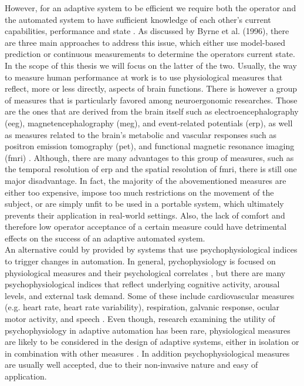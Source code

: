 However, for an adaptive system to be efficient we require both the operator and the automated system to have sufficient knowledge of each other's current capabilities, performance and state \cite{Byrne1996}.
As discussed by Byrne et al. (1996), there are three main approaches to address this issue, which either use model-based prediction or continuous measurements to determine the operators current state. In the scope of this thesis we will focus on the latter of the two. 
Usually, the way to measure human performance at work is to use physiological measures that reflect, more or less directly, aspects of brain functions. There is however a group of measures that is particularly favored among neuroergonomic researches. Those are the ones that are derived from the brain itself such as electroencephalography (\gls{eeg}), magnetencephalography (\gls{meg}), and event-related potentials (\gls{erp}), as well as measures related to the brain's metabolic and vascular responses such as positron emission tomography (\gls{pet}), and functional magnetic resonance imaging (\gls{fmri}) \cite{Parasuraman2003}. Although, there are many advantages to this group of measures, such as the temporal resolution of \gls{erp} and the spatial resolution of \gls{fmri}, there is still one major disadvantage. In fact, the majority of the abovementioned measures are either too expensive, impose too much restrictions on the movement of the subject, or are simply unfit to be used in a portable system, which ultimately prevents their application in real-world settings. Also, the lack of comfort and therefore low operator acceptance of a certain measure could have detrimental effects on the success of an adaptive automated system.\\
An alternative could by provided by systems that use psychophysiological indices to trigger changes in automation. In general, pychophysiology is focused on physiological measures and their psychological correlates \cite{Parasuraman2003}, but there are many psychophysiological indices that reflect underlying cognitive activity, arousal levels, and external task demand. Some of these include cardiovascular measures (e.g. heart rate, heart rate variability), respiration, galvanic response, ocular motor activity, and speech \cite{Parasuraman2008}. Even though, research examining the utility of psychophysiology in adaptive automation has been rare, physiological measures are likely to be considered in the design of adaptive systems, either in isolation or in combination with other measures \cite{Byrne1996}. In addition psychophysiological measures are usually well accepted, due to their non-invasive nature and easy of application.\\ 
